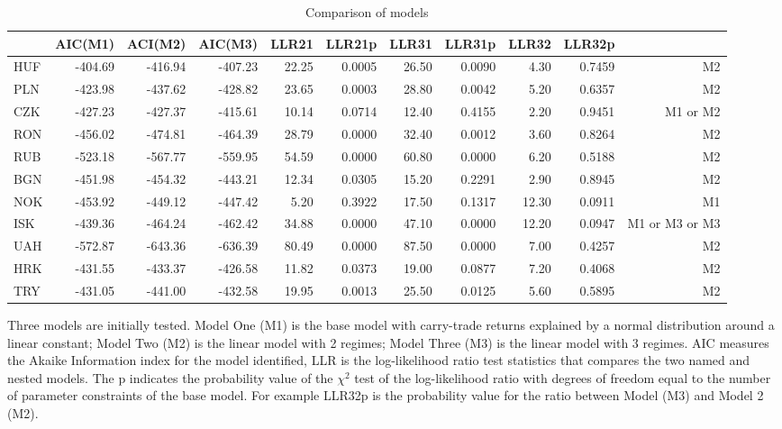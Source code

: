 \documentclass[12pt, a4paper, oneside]{article}\usepackage[]{graphicx}\usepackage[]{color}
\begin{document}
\begin{landscape}
\begin{table}[ht]
\begin{threeparttable}
\centering
\begin{tabular}{l|rrrrrrrrrr}
  \hline
 & AIC(M1) & ACI(M2) & AIC(M3) & LLR21 & LLR21p & LLR31 & LLR31p & LLR32 & LLR32p \\ 
  \hline
HUF & -404.69 & -416.94 & -407.23 & 22.25 & 0.0005 & 26.50 & 0.0090 & 4.30 & 0.7459 & M2\\ 
  PLN & -423.98 & -437.62 & -428.82 & 23.65 & 0.0003 & 28.80 & 0.0042 & 5.20 & 0.6357 & M2\\ 
  CZK & -427.23 & -427.37 & -415.61 & 10.14 & 0.0714 & 12.40 & 0.4155 & 2.20 & 0.9451 & M1 or M2\\ 
  RON & -456.02 & -474.81 & -464.39 & 28.79 & 0.0000 & 32.40 & 0.0012 & 3.60 & 0.8264 & M2\\ 
  RUB & -523.18 & -567.77 & -559.95 & 54.59 & 0.0000 & 60.80 & 0.0000 & 6.20 & 0.5188 & M2\\ 
  BGN & -451.98 & -454.32 & -443.21 & 12.34 & 0.0305 & 15.20 & 0.2291 & 2.90 & 0.8945 & M2\\ 
  NOK & -453.92 & -449.12 & -447.42 & 5.20 & 0.3922 & 17.50 & 0.1317 & 12.30 & 0.0911 & M1\\ 
  ISK & -439.36 & -464.24 & -462.42 & 34.88 & 0.0000 & 47.10 & 0.0000 & 12.20 & 0.0947 & M1 or M3 or M3\\ 
  UAH & -572.87 & -643.36 & -636.39 & 80.49 & 0.0000 & 87.50 & 0.0000 & 7.00 & 0.4257 & M2\\ 
  HRK & -431.55 & -433.37 & -426.58 & 11.82 & 0.0373 & 19.00 & 0.0877 & 7.20 & 0.4068 & M2\\ 
  TRY & -431.05 & -441.00 & -432.58 & 19.95 & 0.0013 & 25.50 & 0.0125 & 5.60 & 0.5895 & M2\\ 
   \hline
\end{tabular}
\begin{tablenotes}
\small
\item Three models are initially tested.  Model One (M1) is the base model with carry-trade returns explained by a normal distribution around a linear constant; Model Two (M2) is the linear model with 2 regimes; Model Three (M3) is the linear model with 3 regimes.  AIC measures the Akaike Information index for the model identified, LLR is the log-likelihood ratio test statistics that compares the two named and nested models.  The p indicates the probability value of the $\chi^2$ test of the log-likelihood ratio with degrees of freedom equal to the number of parameter constraints of the base model.  For example LLR32p is the probability value for the ratio between Model (M3) and Model 2 (M2).
\end{tablenotes}
\caption{Comparison of models}
\label{tabref:comptab2}
\end{threeparttable}
\end{table} 
\end{landscape}
\end{document}
